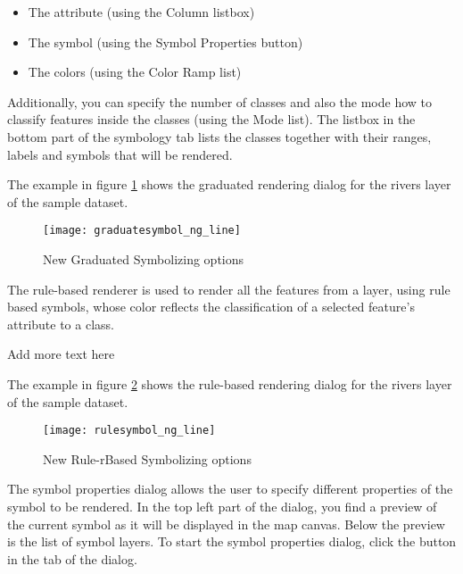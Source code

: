 \begin{itemize}[label=--]
\item The attribute (using the Column listbox)
\item The symbol (using the Symbol Properties button)
\item The colors (using the Color Ramp list)
\end{itemize}

Additionally, you can specify the number of classes and also the mode how to
classify features inside the classes (using the Mode list). The listbox in the
bottom part of the symbology tab lists the classes together with their ranges,
labels and symbols that will be rendered.

The example in figure \ref{fig:gradsymNG} shows the graduated rendering dialog
for the rivers layer of the \qg sample dataset.

\begin{figure}[ht]
   \centering
   \texttt{[image: graduatesymbol\_ng\_line]}
   \caption{New Graduated Symbolizing options \nixcaption}\label{fig:gradsymNG}
\end{figure}


The rule-based renderer is used to render all the features from a layer, using
rule based symbols, whose color reflects the classification of a selected
feature's attribute to a class.

Add more text here

The example in figure \ref{fig:rulesymNG} shows the rule-based rendering dialog
for the rivers layer of the \qg sample dataset.

\begin{figure}[ht]
   \centering
   \texttt{[image: rulesymbol\_ng\_line]}
   \caption{New Rule-rBased Symbolizing options \nixcaption}\label{fig:rulesymNG}
\end{figure}


The symbol properties dialog allows the user to specify different properties of
the symbol to be rendered. In the top left part of the dialog, you find a preview
of the current symbol as it will be displayed in the map canvas. Below the preview
is the list of symbol layers. To start the symbol properties dialog, click the
 button in the  tab of the
 dialog.

